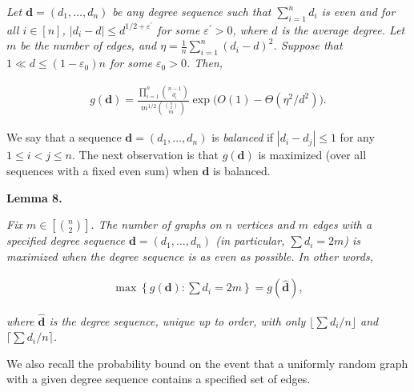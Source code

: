 \emph{Let $\mathbf{d}=(d_{1},\ldots,d_{n})$ be any degree sequence such that $\sum_{i=1}^{n}d_{i}$ is
even and for all $i\in[n]$, $|d_{i}-d|\leq d^{1/2+\varepsilon^{\prime}}$
for some $\varepsilon^{\prime}>0$, where $d$ is the average degree.
Let $m$ be the number of edges, and
$\eta=\frac{1}{n}\sum_{i=1}^{n}(d_{i}-d)^{2}$.
Suppose that $1\ll d\leq(1-\varepsilon_{0})n$ for some $\varepsilon_{0}>0$.
Then,}\par


\[\begin{gathered}
g(\mathbf{d})=\frac{\prod_{i=1}^{n}\binom{n-1}{d_{i}}}{m^{1/2}\binom{\binom{n}{2}}{m}}\exp\bigl(O(1)-\Theta(\eta^{2}/d^{2})\bigr).
\end{gathered}\]






We say that a sequence $\mathbf{d}=(d_{1},\ldots,d_{n})$ is \emph{balanced} if $|d_{i}-d_{j}|\leq 1$ for any $1\leq i<j\leq n$. The next observation is that $g(\mathbf{d})$ is maximized (over all sequences with a fixed even sum) when $\mathbf{d}$ is balanced.\par





\par\medskip\noindent\textbf{
\textbf{Lemma 8}\textbf{.}
}\par



\emph{Fix $m\in\left[\binom{n}{2}\right]$. The number of graphs on $n$ vertices and $m$ edges with a specified degree sequence $\mathbf{d}=(d_{1},\ldots,d_{n})$ (in particular, $\sum d_{i}=2m$) is maximized when the degree sequence is as even as possible. In other words,}\par


\[\begin{gathered}
\max\left\{g(\mathbf{d}):\sum d_{i}=2m\right\}=g(\mathbf{\hat{d}}),
\end{gathered}\]


\emph{where $\mathbf{\hat{d}}$ is the degree sequence, unique up to order, with only $\lfloor\sum d_{i}/n\rfloor$ and $\lceil\sum d_{i}/n\rceil$.}\par






We also recall the probability bound on the event that a uniformly random graph with a given degree sequence contains a specified set of edges.\par




